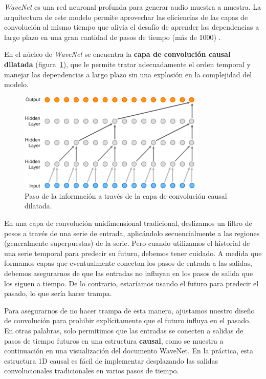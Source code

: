 \documentclass[a4paper,12pt]{article}
\begin{document}
\textit{WaveNet} es una red neuronal profunda para generar audio muestra a muestra. La arquitectura de este modelo permite aprovechar las eficiencias de las capas de convolución al mismo tiempo que alivia el desafío de aprender las dependencias a largo plazo en una gran cantidad de pasos de tiempo (más de 1000) \citep{wavenet2}.

En el núcleo de \textit{WaveNet} se encuentra la \textbf{capa de convolución causal dilatada} (figura~\ref{fig:causal-conv}), que le permite tratar adecuadamente el orden temporal y manejar las dependencias a largo plazo sin una explosión en la complejidad del modelo. \citep{wavenet}

\begin{figure}[H]
	\begin{center}				
	\includegraphics[width=0.8\textwidth]{causal-conv.png}
  	\caption{Paso de la información a través de la capa de convolución causal dilatada.}
  	\label{fig:causal-conv}
  	\end{center}
\end{figure}

En una capa de convolución unidimensional tradicional, deslizamos un filtro de pesos a través de una serie de entrada, aplicándolo secuencialmente a las regiones (generalmente superpuestas) de la serie. Pero cuando utilizamos el historial de una serie temporal para predecir su futuro, debemos tener cuidado. A medida que formamos capas que eventualmente conectan los pasos de entrada a las salidas, debemos asegurarnos de que las entradas no influyan en los pasos de salida que los siguen a tiempo. De lo contrario, estaríamos usando el futuro para predecir el pasado, lo que sería hacer trampa.

Para asegurarnos de no hacer trampa de esta manera, ajustamos nuestro diseño de convolución para prohibir explícitamente que el futuro influya en el pasado. En otras palabras, solo permitimos que las entradas se conecten a salidas de pasos de tiempo futuros en una estructura \textbf{causal}, como se muestra a continuación en una visualización del documento WaveNet. En la práctica, esta estructura 1D causal es fácil de implementar desplazando las salidas convolucionales tradicionales en varios pasos de tiempo.
\end{document}
